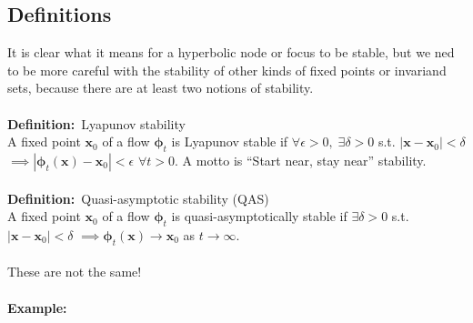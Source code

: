 \documentclass{article}
\newcommand{\example}{\textbf{Example:}}                    %
\newcommand{\definition}{\textbf{Definition:}}              %
\newcommand{\bp}{\bm{\phi}}                                 %
\begin{document}
\subsection{Definitions}
It is clear what it means for a hyperbolic node or focus to be stable, but we
ned to be more careful with the stability of other kinds of fixed points or 
invariand sets, because there are at least two notions of stability.
\\
\\
\definition\ Lyapunov stability
\\
A fixed point $\bm{x}_0$ of a flow $\bp_t$ is Lyapunov stable if
$\forall \epsilon > 0, \; \exists \delta > 0$ s.t. $|\bm{x}-\bm{x}_0| < \delta$
$\implies |\bp_t(\bm{x}) - \bm{x}_0| < \epsilon$ $\forall t>0$.
A motto is ``Start near, stay near'' stability.
\\
\\
\definition\ Quasi-asymptotic stability (QAS)
\\
A fixed point $\bm{x}_0$ of a flow $\bp_t$ is quasi-asymptotically 
stable if $\exists \delta > 0$ s.t. $|\bm{x}-\bm{x}_0| < \delta$ $\implies
\bp_t(\bm{x}) \to \bm{x}_0$ as $t \to \infty$.
\\
\\
These are not the same!
\\
\\
\example\
\\
\end{document}
